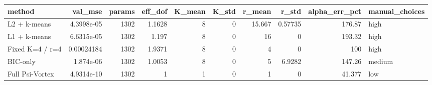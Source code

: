 \begin{tabular}{lrrrrrrrrl}
\toprule
method & val_mse & params & eff_dof & K_mean & K_std & r_mean & r_std & alpha_err_pct & manual_choices \\
\midrule
L2 + k-means & 4.3998e-05 & 1302 & 1.1628 & 8 & 0 & 15.667 & 0.57735 & 176.87 & high \\
L1 + k-means & 6.6315e-05 & 1302 & 1.197 & 8 & 0 & 16 & 0 & 193.32 & high \\
Fixed K=4 / r=4 & 0.00024184 & 1302 & 1.9371 & 8 & 0 & 4 & 0 & 100 & high \\
BIC-only & 1.874e-06 & 1302 & 1.0053 & 8 & 0 & 5 & 6.9282 & 147.26 & medium \\
Full Psi-Vortex & 4.9314e-10 & 1302 & 1 & 1 & 0 & 1 & 0 & 41.377 & low \\
\bottomrule
\end{tabular}
